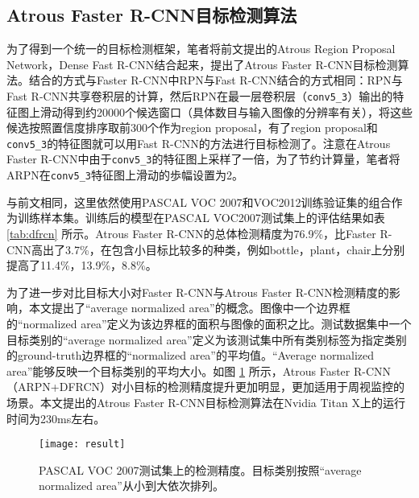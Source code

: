 \subsection{Atrous Faster R-CNN目标检测算法}
为了得到一个统一的目标检测框架，笔者将前文提出的Atrous Region Proposal Network，Dense Fast R-CNN结合起来，提出了Atrous Faster R-CNN目标检测算法。结合的方式与Faster R-CNN中RPN与Fast R-CNN结合的方式相同：RPN与Fast R-CNN共享卷积层的计算，然后RPN在最一层卷积层（\texttt{conv5\_3}）输出的特征图上滑动得到约20000个候选窗口（具体数目与输入图像的分辨率有关），将这些候选按照置信度排序取前300个作为region proposal，有了region proposal和\texttt{conv5\_3}的特征图就可以用Fast R-CNN的方法进行目标检测了。注意在Atrous Faster R-CNN中由于\texttt{conv5\_3}的特征图上采样了一倍，为了节约计算量，笔者将ARPN在\texttt{conv5\_3}特征图上滑动的歩幅设置为2。

与前文相同，这里依然使用PASCAL VOC 2007和VOC2012训练验证集的组合作为训练样本集。训练后的模型在PASCAL VOC2007测试集上的评估结果如表 \ref{tab:dfrcn} 所示。Atrous Faster R-CNN的总体检测精度为76.9\%，比Faster R-CNN高出了3.7\%，在包含小目标比较多的种类，例如bottle，plant，chair上分别提高了11.4\%，13.9\%，8.8\%。

为了进一步对比目标大小对Faster R-CNN与Atrous Faster R-CNN检测精度的影响，本文提出了``average normalized area''的概念。图像中一个边界框的``normalized area''定义为该边界框的面积与图像的面积之比。测试数据集中一个目标类别的``average normalized area''定义为该测试集中所有类别标签为指定类别的ground-truth边界框的``normalized area''的平均值。``Average normalized area''能够反映一个目标类别的平均大小。如图 \ref{fig:rank} 所示，Atrous Faster R-CNN（ARPN+DFRCN）对小目标的检测精度提升更加明显，更加适用于周视监控的场景。本文提出的Atrous Faster R-CNN目标检测算法在Nvidia Titan X上的运行时间为230ms左右。
\begin{figure}[h]
	\centering
	\texttt{[image: result]}
	\caption{PASCAL VOC 2007测试集上的检测精度。目标类别按照``average normalized area''从小到大依次排列。}
	\label{fig:rank}
\end{figure}

